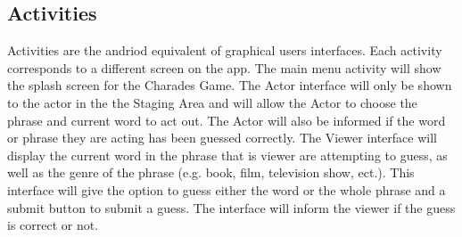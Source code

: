 \documentclass{article}
\begin{document}
\subsection{Activities}
Activities are the andriod equivalent of graphical users interfaces. Each activity corresponds to a different screen on the app.
The main menu activity will show the splash screen for the Charades Game.
The Actor interface will only be shown to the actor in the the Staging Area and will allow the Actor to choose the phrase and current word to act out. The Actor will also be informed if the word or phrase they are acting has been guessed correctly.
The Viewer interface will display the current word in the phrase that is viewer are attempting to guess, as well as the genre of the phrase (e.g. book, film, television show, ect.). This interface will give the option to guess either the word or the whole phrase and a submit button to submit a guess. The interface will inform the viewer if the guess is correct or not.
\end{document}

